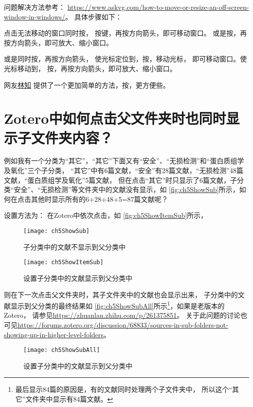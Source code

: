 \documentclass[cn,11pt,chinese]{elegantbook}
\begin{document}
			问题解决方法参考：
			\url{https://www.askvg.com/how-to-move-or-resize-an-off-screen-window-in-windows/}。
			具体步骤如下：
			
			点击无法移动的窗口同时按，
			按键，再按方向箭头，即可移动窗口。
			或是按，再按方向箭头，即可放大、缩小窗口。
			
			或是同时按，再按方向箭头，
			使光标定位到，按，移动光标，
			即可移动窗口。使光标移动到，
			按，再按方向箭头，即可放大、缩小窗口。
			
			网友\href{https://www.zhihu.com/people/lin-zhi-70}{林知}
			提供了一个更加简单的方法，按，更方便些。
	\section{Zotero中如何点击父文件夹时也同时显示子文件夹内容？}\label{sec:ShowSub}	
				例如我有一个分类为“其它”，“其它”下面又有“安全”、“无损检测”和“蛋白质组学及氧化”三个子分类，
				“其它”中有6篇文献，“安全”有28篇文献，“无损检测”48篇文献，“蛋白质组学及氧化”5篇文献，
				但在点击“其它”时只显示了6篇文献，子分类“安全”、“无损检测”等文件夹中的文献没有显示，如
				\autoref{fig:ch5ShowSub}所示，如何在点击其他时显示所有的6+28+48+5=87篇文献呢？


				设置方法为：
				在Zotero中依次点击，如
				\autoref{fig:ch5ShowItemSub}所示，
				\begin{figure}[ht]
					\centering
					\texttt{[image: ch5ShowSub]}
					\caption{子分类中的文献不显示到父分类中}
					\label{fig:ch5ShowSub}
				\end{figure}	
				\begin{figure}[ht]
					\centering
					\texttt{[image: ch5ShowItemSub]}
					\caption{设置子分类中的文献显示到父分类中}
					\label{fig:ch5ShowItemSub}
				\end{figure}
				则在下一次点击父文件夹时，其子文件夹中的文献也会显示出来，
				子分类中的文献显示到父分类的最终结果如
				\autoref{fig:ch5ShowSubAll}所示\footnote{
				最后显示84篇的原因是，有的文献同时处理两个子文件夹中，
				所以这个“其它”文件夹中显示有84篇文献。}，如果是老版本的
				Zotero，
				请参见\url{https://zhuanlan.zhihu.com/p/261375851}。
				关于此问题的讨论也可见\url{https://forums.zotero.org/discussion/68833/sources-in-sub-folders-not-showing-up-in-higher-level-folders}。
				\begin{figure}[ht]
					\centering
					\texttt{[image: ch5ShowSubAll]}
					\caption{设置子分类中的文献显示到父分类中}
					\label{fig:ch5ShowSubAll}
				\end{figure}
\end{document}
